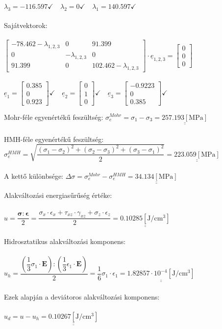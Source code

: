 \documentclass[10pt, a4paper]{article}
\newcommand{\hatodik}{\begin{trivlist}\item[\hskip \labelsep {\bfseries 
			{6. Feladat:}}]\end{trivlist}}
\newcommand{\het}{\begin{trivlist}\item[\hskip \labelsep {\bfseries 
			{7. Feladat:}}]\end{trivlist}}
\newcommand{\mpa}{\mathrm{\left[MPa\right]}}
\newcommand{\jpcm}{\mathrm{\left[J/cm^3\right]}}
\begin{document}
	$\lambda_3 = -116.597\checkmark \quad \lambda_2 = 0\checkmark \quad \lambda_1 = 140.597\checkmark$\\\\
	Sajátvektorok:\\\\
	$\begin{bmatrix}
		-78.462-\lambda_{1,2,3} & 0 & 91.399\\
		0 & -\lambda_{1,2,3} & 0\\
		91.399 & 0 & 102.462-\lambda_{1,2,3}
	\end{bmatrix} \cdot \underline{e}_{1,2,3} = \begin{bmatrix}
	0\\
	0\\ 
	0 
	\end{bmatrix}$\\\\
	$\underline{e}_1 = \begin{bmatrix}0.385 \\ 0 \\ 0.923\end{bmatrix}\checkmark \quad \underline{e}_2 = \begin{bmatrix}0 \\ 1 \\ 0\end{bmatrix}\checkmark \quad \underline{e}_3 = \begin{bmatrix}-0.9223 \\ 0 \\ 0.385\end{bmatrix}\checkmark$
	\hatodik
	Mohr-féle egyenértékű feszültség: $\sigma_e^{Mohr} = \sigma_1 - \sigma_3 = \underline{\underline{257.193 \mpa}}$\\\\
	HMH-féle egyenértékű feszültség: $\sigma_e^{HMH} = \sqrt{\dfrac{(\sigma_1 - \sigma_2)^2 + (\sigma_2 - \sigma_3)^2 + (\sigma_3 - \sigma_1)^2}{2}} = \underline{\underline{223.059 \mpa}}$\\\\
	A kettő különbsége: $\Delta\sigma = \sigma_e^{Mohr} - \sigma_e^{HMH} = \underline{\underline{34.134 \mpa}}$
	\het
	Alakváltozási energiasűrűség értéke:\\\\
	$u = \dfrac{\boldsymbol{\sigma} : \boldsymbol{\epsilon}}{2} = \dfrac{\sigma_x \cdot \epsilon_x + \tau_{xz} \cdot \gamma_{xz} + \sigma_z \cdot \epsilon_z}{2} = \underline{\underline{0.10285 \jpcm}}$\\\\
	Hidrosztatikus alakváltozási komponens:\\\\
	$u_h =  \dfrac{(\dfrac{1}{3}\sigma_1 \cdot \textbf{E}) : (\dfrac{1}{3}\epsilon_1 \cdot \textbf{E})}{2} = \dfrac{1}{6}\sigma_1 \cdot \epsilon_1 = \underline{\underline{1.82857 \cdot 10^{-4} \jpcm}}$\\\\
	Ezek alapján a deviátoros alakváltozási komponens:\\\\
	$u_d = u - u_h = \underline{\underline{0.10267 \jpcm}}$
\end{document}
